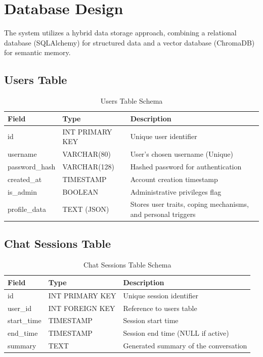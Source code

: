 \section{Database Design}

The system utilizes a hybrid data storage approach, combining a relational database (SQLAlchemy) for structured data and a vector database (ChromaDB) for semantic memory.

\subsection{Users Table}
\begin{table}[H]
\centering
\caption{Users Table Schema}
\label{tab:users_table}
\begin{tabular}{|p{3cm}|p{3cm}|p{9cm}|}
\hline
Field & Type & Description \\ \hline
id & INT PRIMARY KEY & Unique user identifier \\ 
username & VARCHAR(80) & User's chosen username (Unique) \\ 
password\_hash & VARCHAR(128) & Hashed password for authentication \\ 
created\_at & TIMESTAMP & Account creation timestamp \\ 
is\_admin & BOOLEAN & Administrative privileges flag \\ 
profile\_data & TEXT (JSON) & Stores user traits, coping mechanisms, and personal triggers \\ 
\hline
\end{tabular}
\end{table}

\subsection{Chat Sessions Table}
\begin{table}[H]
\centering
\caption{Chat Sessions Table Schema}
\label{tab:sessions_table}
\begin{tabular}{|p{3cm}|p{3cm}|p{9cm}|}
\hline
Field & Type & Description \\ \hline
id & INT PRIMARY KEY & Unique session identifier \\ 
user\_id & INT FOREIGN KEY & Reference to users table \\ 
start\_time & TIMESTAMP & Session start time \\ 
end\_time & TIMESTAMP & Session end time (NULL if active) \\ 
summary & TEXT & Generated summary of the conversation \\ 
\hline
\end{tabular}
\end{table}

